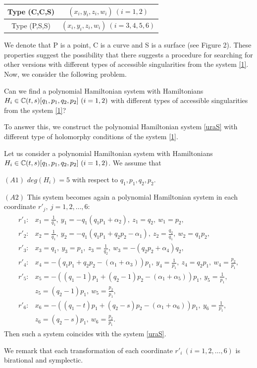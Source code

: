 \begin{center}
\begin{tabular}{|c|c|} \hline 
Type (C,C,S) & $(x_i,y_i,z_i,w_i) \ (i=1,2)$    \\ \hline 
Type (P,S,S) & $(x_i,y_i,z_i,w_i) \ (i=3,4,5,6)$    \\ \hline 
\end{tabular}
\end{center}
We denote that P is a point, C is a curve and S is a surface (see Figure 2). These properties suggest the possibility that there suggests a procedure for searching for other versions with different types of accessible singularities from the system \eqref{1}. Now, we consider the following problem.




\begin{Problem}
Can we find a polynomial Hamiltonian system with Hamiltonians $H_i \in {\Bbb C}(t,s)[q_1,p_1,q_2,p_2] \ (i=1,2)$ with different types of accessible singularities from the system \eqref{1}?
\end{Problem}

To answer this, we construct the polynomial Hamiltonian system \eqref{uraS} with different type of holomorphy conditions of the system \eqref{1}.

\begin{thm}\label{holoURA}
Let us consider a polynomial Hamiltonian system with Hamiltonians $H_i \in {\Bbb C}(t,s)[q_1,p_1,q_2,p_2] \ (i=1,2)$. We assume that

$(A1)$ $deg(H_i)=5$ with respect to $q_1,p_1,q_2,p_2$.

$(A2)$ This system becomes again a polynomial Hamiltonian system in each coordinate $r'_j, \ j=1,2,\dots,6${\rm : \rm}
\begin{align}
\begin{split}
r'_1:&x_1=\frac{1}{q_1}, \ y_1=-q_1(q_1p_1+\alpha_2), \ z_1=q_2, \ w_1=p_2,\\
r'_2:&x_2=\frac{1}{q_1}, \ y_2=-q_1(q_1p_1+q_2p_2-\alpha_1), \ z_2=\frac{q_2}{q_1}, \ w_2=q_1p_2,\\
r'_3:&x_3=q_1,\ y_3=p_1,\ z_3=\frac{1}{q_2},\ w_3=-(q_2p_2+\alpha_4)q_2,\\
r'_4:&x_4=-(q_1p_1+q_2p_2-(\alpha_1+\alpha_3))p_1, \ y_4=\frac{1}{p_1}, \ z_4=q_2p_1, \ w_4=\frac{p_2}{p_1},\\
r'_5:&x_5=-((q_1-1)p_1+(q_2-1)p_2-(\alpha_1+\alpha_5))p_1, \ y_5=\frac{1}{p_1},\\
&z_5=(q_2-1)p_1, \ w_5=\frac{p_2}{p_1},\\
r'_6:&x_6=-((q_1-t)p_1+(q_2-s)p_2-(\alpha_1+\alpha_6))p_1, \ y_6=\frac{1}{p_1},\\
&z_6=(q_2-s)p_1, \ w_6=\frac{p_2}{p_1}.
\end{split}
\end{align}
Then such a system coincides with the system \eqref{uraS}.
\end{thm}
We remark that each transformation of each coordinate $r'_i \ (i=1,2,\dots,6)$ is birational and symplectic.

